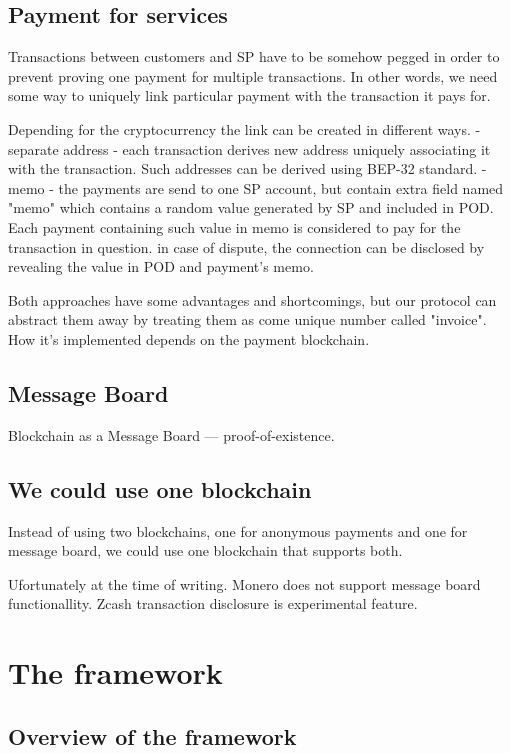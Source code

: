 \documentclass{article}
\begin{document}
\subsection{Payment for services}
Transactions between customers and SP have to be somehow pegged in order to prevent proving one payment for multiple transactions. In other words, we need some way to uniquely link particular payment with the transaction it pays for. 

Depending for the cryptocurrency the link can be created in different ways. 
- separate address - each transaction derives new address uniquely associating it with the transaction. Such addresses can be derived using BEP-32 standard. 
- memo - the payments are send to one SP account, but contain extra field named "memo" which contains a random value generated by SP and included in POD. Each payment containing such value in memo is considered to pay for the transaction in question. in case of dispute, the connection can be disclosed by revealing the value in POD and  payment's memo. 


Both approaches have some advantages and shortcomings, but our protocol can abstract them away by treating them as come unique number called "invoice". How it's implemented  depends on the payment blockchain. 

\subsection{Message Board}
Blockchain as a Message Board — proof-of-existence.

\subsection{We could use one blockchain}
Instead of using two blockchains, one for anonymous payments and one for message board, we could use one blockchain that supports both.

Ufortunately at the time of writing. Monero does not support message board functionallity. Zcash transaction disclosure is experimental feature.


\section{The framework}

\subsection{Overview of the framework}
\end{document}
